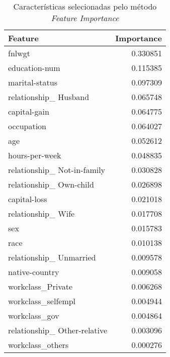 \begin{table}
\centering
\caption{Características selecionadas pelo método \textit{Feature Importance}}
\begin{tabular}{lr}
\toprule
                      Feature &  Importance \\
\midrule
                       fnlwgt &    0.330851 \\
                education-num &    0.115385 \\
               marital-status &    0.097309 \\
        relationship\_ Husband &    0.065748 \\
                 capital-gain &    0.064775 \\
                   occupation &    0.064027 \\
                          age &    0.052612 \\
               hours-per-week &    0.048835 \\
  relationship\_ Not-in-family &    0.030828 \\
      relationship\_ Own-child &    0.026898 \\
                 capital-loss &    0.021018 \\
           relationship\_ Wife &    0.017708 \\
                          sex &    0.015783 \\
                         race &    0.010138 \\
      relationship\_ Unmarried &    0.009578 \\
               native-country &    0.009058 \\
            workclass\_Private &    0.006268 \\
           workclass\_selfempl &    0.004944 \\
                workclass\_gov &    0.004864 \\
 relationship\_ Other-relative &    0.003096 \\
             workclass\_others &    0.000276 \\
\bottomrule
\end{tabular}
\end{table}
